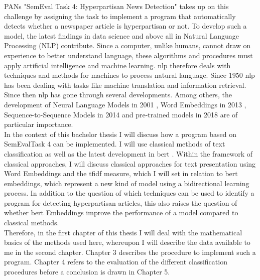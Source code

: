 \documentclass[a4paper, 11pt,titlepage,oneside,openany]{book}
\begin{document}
\indent PANs "SemEval Task 4: Hyperpartisan News Detection" \cite{hyperpartisannewsdetection} takes up on this challenge by assigning the task to implement a program that automatically detects whether a newspaper article is hyperpartisan or not. To develop such a model, the latest findings in data science and above all in Natural Language Processing (NLP) contribute. Since a computer, unlike humans, cannot draw on experience to better understand language, these algorithms and procedures must apply artificial intelligence and machine learning. \gls{nlp} therefore deals with techniques and methods for machines to process natural language. Since 1950 \gls{nlp} has been dealing with tasks like machine translation and information retrieval. Since then \gls{nlp} has gone through several developments. Among others, the development of Neural Language Models in 2001 \cite{neural}, Word Embeddings in 2013 \cite{wb1}, Sequence-to-Sequence Models in 2014 \cite{s2s} and pre-trained models in 2018 \cite{pre1}\cite{pre2}\cite{pre3} are of particular importance. \\
\indent In the context of this bachelor thesis I will discuss how a program based on SemEvalTask 4 can be implemented. I will use classical methods of text classification as well as the latest development in \gls{bert} \cite{bert}. Within the framework of classical approaches, I will discuss classical approaches for text presentation using Word Embeddings and the \gls{tfidf}  \cite{infor} measure, which I will set in relation to \gls{bert} embeddings, which represent a new kind of model using a bidirectional learning process. In addition to the question of which techniques can be used to identify a program for detecting hyperpartisan articles, this also raises the question of whether \gls{bert} Embeddings improve the performance of a model compared to classical methods. \\
\indent Therefore, in the first chapter of this thesis I will deal with the mathematical basics of the methods used here, whereupon I will describe the data available to me in the second chapter. Chapter 3 describes the procedure to implement such a program. Chapter 4 refers to the evaluation of the different classification procedures before a conclusion is drawn in Chapter 5. 
\end{document}
